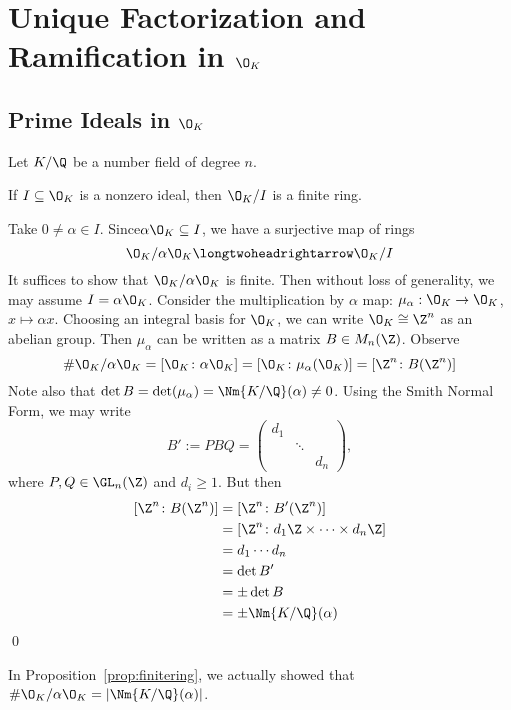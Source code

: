 
\section{Unique Factorization and Ramification in $\O_K$}
\subsection{Prime Ideals in $\O_K$}

Let $K/\Q$ be a number field of degree $n$. 

\begin{prop}\label{prop:finitering}
If $I \subseteq \O_K$ is a nonzero ideal, then $\O_K/I$ is a finite ring. 
\end{prop}

\pf Take $0 \neq \alpha \in I$. Since$ \alpha\O_K \subseteq I$, we have a surjective map of rings 
	\[
	\O_K/\alpha \O_K \longtwoheadrightarrow \O_K/I
	\]
It suffices to show that $\O_K/\alpha\O_K$ is finite. Then without loss of generality, we may assume $I=\alpha \O_K$. Consider the multiplication by $\alpha$ map: $\mu_\alpha: \O_K \to \O_K$, $x \mapsto \alpha x$. Choosing an integral basis for $\O_K$, we can write $\O_K \cong \Z^n$ as an abelian group. Then $\mu_\alpha$ can be written as a matrix $B \in M_n(\Z)$. Observe
	\[
	\#\O_K/\alpha\O_K=[\O_K \colon \alpha \O_K]=[\O_K \colon \mu_\alpha(\O_K)]= [\Z^n \colon B(\Z^n)]
	\]
Note also that $\det B= \det(\mu_\alpha)= \Nm{K/\Q}(\alpha) \neq 0$. Using the Smith Normal Form, we may write
	\[
	B':= PBQ= \begin{pmatrix} d_1 & & \\ & \ddots & \\ & & d_n \end{pmatrix},
	\]
where $P,Q \in \GL_n(\Z)$ and $d_i \geq 1$. But then
	\[
	\begin{split}
	[\Z^n \colon B(\Z^n)]&= [\Z^n \colon B'(\Z^n)] \\
	&=[\Z^n \colon d_1 \Z \times \cdots \times d_n \Z] \\
	&= d_1 \cdots d_n \\
	&= \det B' \\
	&= \pm \det B \\
	&= \pm \Nm{K/\Q}(\alpha)
	\end{split}
	\] \qed \\

\begin{rem}
In Proposition~\ref{prop:finitering}, we actually showed that $\#\O_K/\alpha\O_K=|\Nm{K/\Q}(\alpha)|$.
\end{rem}


